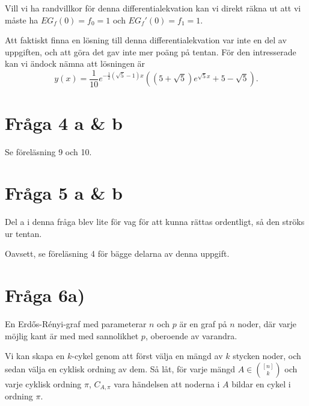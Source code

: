 \documentclass[nobib]{tufte-handout}
\begin{document}
Vill vi ha randvillkor för denna differentialekvation kan vi direkt räkna ut att vi måste ha $EG_f(0) = f_0 = 1$ och $EG_f'(0) = f_1 = 1$.

Att faktiskt finna en lösning till denna differentialekvation var inte en del av uppgiften, och att göra det gav inte mer poäng på tentan. För den intresserade kan vi ändock nämna att lösningen är
$$y(x) = \frac{1}{10} e^{-\frac{1}{2} (\sqrt{5} - 1) x} \left((5 + \sqrt{5}) e^{\sqrt{5} x} + 5 - \sqrt{5}\right).$$

\section{Fråga 4 a \& b}

Se föreläsning 9 och 10.

\section{Fråga 5 a \& b}

Del a i denna fråga blev lite för vag för att kunna rättas ordentligt, så den ströks ur tentan.

Oavsett, se föreläsning 4 för bägge delarna av denna uppgift.

\section{Fråga 6a)}

En Erd\H{o}s-Rényi-graf med parameterar $n$ och $p$ är en graf på $n$ noder, där varje möjlig kant är med med sannolikhet $p$, oberoende av varandra.

Vi kan skapa en $k$-cykel genom att först välja en mängd av $k$ stycken noder, och sedan välja en cyklisk ordning av dem. Så låt, för varje mängd $A \in {[n] \choose k}$ och varje cyklisk ordning $\pi$, $C_{A,\pi}$ vara händelsen att noderna i $A$ bildar en cykel i ordning $\pi$.
\end{document}
